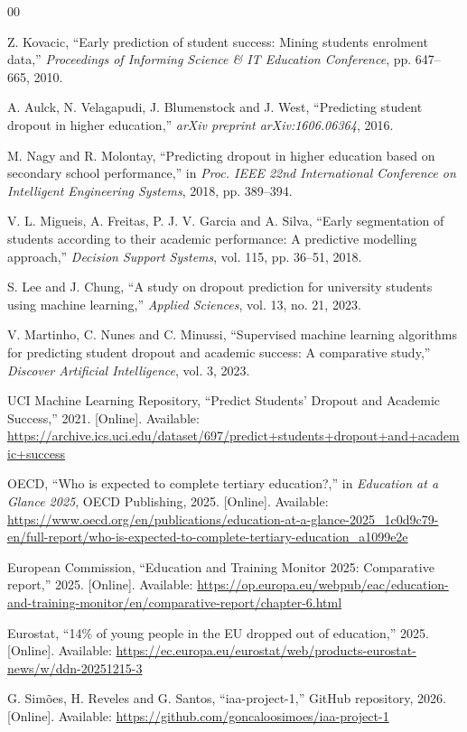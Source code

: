 \documentclass[conference]{IEEEtran}
\begin{document}
\begin{thebibliography}{00}
\balance

Z. Kovacic, ``Early prediction of student success: Mining students enrolment data,'' \textit{Proceedings of Informing Science \& IT Education Conference}, pp. 647--665, 2010.

A. Aulck, N. Velagapudi, J. Blumenstock and J. West, ``Predicting student dropout in higher education,'' \textit{arXiv preprint arXiv:1606.06364}, 2016.

M. Nagy and R. Molontay, ``Predicting dropout in higher education based on secondary school performance,'' in \textit{Proc. IEEE 22nd International Conference on Intelligent Engineering Systems}, 2018, pp. 389--394.

V. L. Migueis, A. Freitas, P. J. V. Garcia and A. Silva, ``Early segmentation of students according to their academic performance: A predictive modelling approach,'' \textit{Decision Support Systems}, vol. 115, pp. 36--51, 2018.

S. Lee and J. Chung, ``A study on dropout prediction for university students using machine learning,'' \textit{Applied Sciences}, vol. 13, no. 21, 2023.

V. Martinho, C. Nunes and C. Minussi, ``Supervised machine learning algorithms for predicting student dropout and academic success: A comparative study,'' \textit{Discover Artificial Intelligence}, vol. 3, 2023.

UCI Machine Learning Repository, ``Predict Students' Dropout and Academic Success,'' 2021. [Online]. Available: \url{https://archive.ics.uci.edu/dataset/697/predict+students+dropout+and+academic+success}

OECD, ``Who is expected to complete tertiary education?,'' in \textit{Education at a Glance 2025}, OECD Publishing, 2025. [Online]. Available: \url{https://www.oecd.org/en/publications/education-at-a-glance-2025_1c0d9c79-en/full-report/who-is-expected-to-complete-tertiary-education_a1099e2e}

European Commission, ``Education and Training Monitor 2025: Comparative report,'' 2025. [Online]. Available: \url{https://op.europa.eu/webpub/eac/education-and-training-monitor/en/comparative-report/chapter-6.html}

Eurostat, ``14\% of young people in the EU dropped out of education,'' 2025. [Online]. Available: \url{https://ec.europa.eu/eurostat/web/products-eurostat-news/w/ddn-20251215-3}

G. Simões, H. Reveles and G. Santos, ``iaa-project-1,'' GitHub repository, 2026. [Online]. Available: \url{https://github.com/goncaloosimoes/iaa-project-1}

\end{thebibliography}
\end{document}
